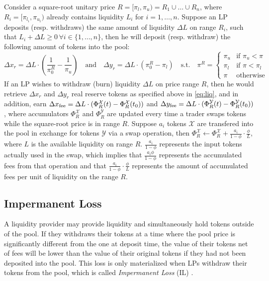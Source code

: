 \documentclass[11pt, letterpaper]{article}
\newcommand{\X}{\mathcal{X}}
\newcommand{\Y}{\mathcal{Y}}
\begin{document}
Consider a square-root unitary price $R=[\pi_l,\pi_u)=R_1\cup\ldots\cup R_n$, where $R_i=[\pi_{l_i},\pi_{u_i})$ already contains liquidity $L_i$ for $i=1,\ldots,n$.
Suppose an LP deposits (resp. withdraws) the same amount of liquidity $\Delta L$ on range $R_i$, such that $L_i+\Delta L\geq 0\,\forall i\in\{1,\ldots,n\}$, then he will deposit (resp. withdraw) the following amount of tokens into the pool:
\begin{equation}
\label{eq:liq}
\Delta x_r = \Delta L \cdot (\frac{1}{\pi_0^R}-\frac{1}{\pi_u})\quad \textrm{and}\quad \Delta y_r = \Delta L\cdot (\pi_0^R-\pi_l)
\quad \textrm{s.t.}\quad
\pi^R = \begin{cases}
    \pi_u & \text{if } \pi_u < \pi \\
    \pi_l & \text{if } \pi < \pi_l \\
    \pi   & \text{otherwise}
\end{cases}
\end{equation}
If an LP wishes to withdraw (burn) liquidity $\Delta L$ on price range $R$, then he would retrieve $\Delta x_r$ and $\Delta y_r$ real reserve tokens as specified above in \eqref{eq:liq}, and in addition, earn $\Delta x_{\rm fee}=\Delta L \cdot (\Phi_R^\X(t)-\Phi_R^\X(t_0))$ and $\Delta y_{\rm fee}=\Delta L \cdot (\Phi_R^\Y(t)-\Phi_R^\Y(t_0))$, where accumulators $\Phi_R^\X$ and $\Phi_R^\Y$ are updated every time a trader swaps tokens while the square-root price is in range $R$.
Suppose $a_i$ tokens $\X$ are transfered into the pool in exchange for tokens $\Y$ via a swap operation, then $\Phi_R^\X\leftarrow\Phi_R^\X + \frac{a_i}{1-\phi}\cdot\frac{\phi}{L}$, where $L$ is the available liquidity on range $R$.
$\frac{a_i}{1-\phi}$ represents the input tokens actually used in the swap, which implies that $\frac{a_i\phi}{1-\phi}$ represents the accumulated fees from that operation and that $\frac{a_i}{1-\phi}\cdot\frac{\phi}{L}$ represents the amount of accumulated fees per unit of liquidity on the range $R$.

\subsection*{Impermanent Loss}
A liquidity provider may provide liquidity and simultaneously hold tokens outside of the pool.
If they withdraws their tokens at a time where the pool price is significantly different from the one at deposit time, the value of their tokens net of fees will be lower than the value of their original tokens if they had not been deposited into the pool. This loss is only materialized when LPs withdraw their tokens from the pool, which is called \textit{Impermanent Loss} (IL) \cite{doi:10.1137/23M1606149}. 
\end{document}
